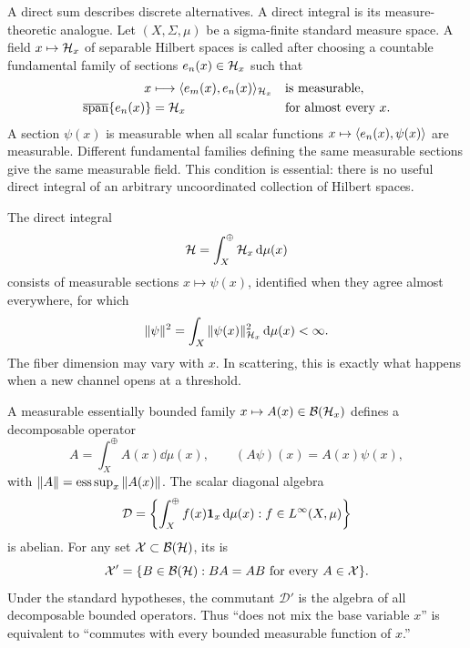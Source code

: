 A direct sum describes discrete alternatives.  A direct integral is its
measure-theoretic analogue.  Let $(X,\Sigma,\mu)$ be a sigma-finite standard
measure space.  A field $x\mapsto\mathcal{H}_x$ of separable Hilbert spaces is called
 after choosing a countable fundamental family of sections
$e_n(x)\in\mathcal{H}_x$ such that
\begin{equation}
  \begin{aligned}
    x&\longmapsto\langle e_m(x),e_n(x)\rangle_{\mathcal{H}_x}
      &&\text{is measurable},\\
    \overline{\operatorname{span}}\{e_n(x)\}&=\mathcal{H}_x
      &&\text{for almost every $x$} .
  \end{aligned}
  \label{eq:measurable-field-fundamental-family}
\end{equation}
A section $\psi(x)$ is measurable when all scalar functions
$x\mapsto\langle e_n(x),\psi(x)\rangle$ are measurable.  Different
fundamental families defining the same measurable sections give the same
measurable field.  This condition is essential: there is no useful direct
integral of an arbitrary uncoordinated collection of Hilbert spaces.

The direct integral
\begin{equation}
  \mathcal{H}=\int_X^\oplus\mathcal{H}_x\,\mathrm{d}\mu(x)
  \label{eq:direct-integral-Hilbert}
\end{equation}
consists of measurable sections $x\mapsto\psi(x)$, identified when they
agree almost everywhere, for which
\begin{equation}
  \|\psi\|^2
  =\int_X\|\psi(x)\|_{\mathcal{H}_x}^2\,\mathrm{d}\mu(x)<\infty .
  \label{eq:direct-integral-norm}
\end{equation}
The fiber dimension may vary with $x$.  In scattering, this is exactly what
happens when a new channel opens at a threshold.

A measurable essentially bounded family
$x\mapsto A(x)\in\mathcal{B}(\mathcal{H}_x)$ defines a decomposable operator
\begin{equation}
  A=\int_X^\oplus A(x)\dd\mu(x),
  \qquad
  (A\psi)(x)=A(x)\psi(x),
  \label{eq:decomposable-operator}
\end{equation}
with $\|A\|=\operatorname{ess\,sup}_x\|A(x)\|$.  The scalar
diagonal algebra
\begin{equation}
  \mathcal D
  =\left\{\int_X^\oplus f(x)\mathbf{1}_x\,\mathrm{d}\mu(x):
  f\in L^\infty(X,\mu)\right\}
  \label{eq:diagonal-algebra}
\end{equation}
is abelian.  For any set $\mathcal X\subset\mathcal{B}(\mathcal{H})$, its
 is
\begin{equation}
  \mathcal X'
  =\{B\in\mathcal{B}(\mathcal{H}):
  \text{$BA=AB$ for every $A\in\mathcal X$}\}.
  \label{eq:commutant-first-definition}
\end{equation}
Under the standard hypotheses, the commutant $\mathcal D'$ is
the algebra of all decomposable bounded operators.  Thus ``does not mix the
base variable $x$'' is equivalent to ``commutes with every bounded measurable
function of $x$.''

